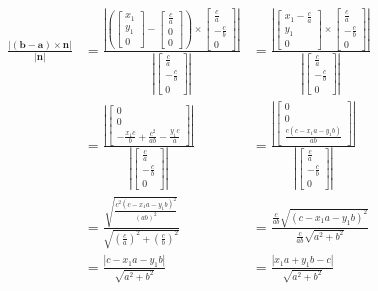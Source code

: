 \documentclass[11pt, a4paper]{article}
\begin{document}
\begin{align*}
\frac{\left| (\boldsymbol{b}-\boldsymbol{a})\times\boldsymbol{n} \right|}{|\boldsymbol{n}|}&=\frac{\left| \left(\begin{bmatrix}x_{1} \\ y_{1} \\ 0 \end{bmatrix}-\begin{bmatrix} \frac{c}{a} \\ 0 \\ 0 \end{bmatrix}\right)\times\begin{bmatrix} \frac{c}{a} \\ -\frac{c}{b} \\ 0 \end{bmatrix} \right|}{\left|\begin{bmatrix} \frac{c}{a} \\ -\frac{c}{b} \\ 0 \end{bmatrix}\right|}&=\frac{\left| \begin{bmatrix}x_{1}-\frac{c}{a} \\ y_{1} \\ 0 \end{bmatrix}\times\begin{bmatrix} \frac{c}{a} \\ -\frac{c}{b} \\ 0 \end{bmatrix} \right|}{\left|\begin{bmatrix} \frac{c}{a} \\ -\frac{c}{b} \\ 0 \end{bmatrix}\right|} \\
&=\frac{\left| \begin{bmatrix}0 \\ 0 \\ -\frac{x_{1}c}{b}+\frac{c^{2}}{ab}-\frac{y_{1}c}{a} \end{bmatrix} \right|}{\left|\begin{bmatrix} \frac{c}{a} \\ -\frac{c}{b} \\ 0 \end{bmatrix}\right|} &=\frac{\left| \begin{bmatrix}0 \\ 0 \\ \frac{c\left( c-x_{1}a-y_{1}b \right)}{ab} \end{bmatrix} \right|}{\left|\begin{bmatrix} \frac{c}{a} \\ -\frac{c}{b} \\ 0 \end{bmatrix}\right|} \\ 
&=\frac{\sqrt{\frac{c^{2}\left( c-x_{1}a-y_{1}b \right)^{2}}{(ab)^{2}}}}{\sqrt{\left( \frac{c}{a} \right)^{2} + \left( \frac{c}{b} \right)^{2}}} &=\frac{\frac{c}{ab}\sqrt{\left( c-x_{1}a-y_{1}b \right)^{2}}}{\frac{c}{ab}\sqrt{a^{2}+b^{2}}} \\
&=\frac{\left| c-x_{1}a-y_{1}b \right|}{\sqrt{a^{2}+b^{2}}} &=\frac{\left| x_{1}a+y_{1}b-c \right|}{\sqrt{a^{2}+b^{2}}}
\end{align*}
\end{document}
